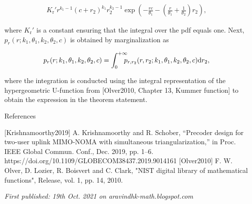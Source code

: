 \begin{align}K_\mathrm{r}' r^{k_1-1} (c+r_2)^{k_1} r_2^{k_2-1}\exp\left(-\frac{rc}{\theta_1}-\left(\frac{r}{\theta_1} +\frac{1}{\theta_2}\right)r_2\right),\end{align}

where $K_\mathrm{r}'$ is a constant ensuring that the integral over the pdf equals one. Next, 
$p_r(r;k_1,\theta_1,k_2,\theta_2,c)$ is obtained by marginalization as

\begin{equation}p_r(r;k_1,\theta_1,k_2,\theta_2,c) = \int_{0}^{+\infty} \hspace{-0.25cm} p_{r,r_2}(r,r_2;k_1,\theta_1,k_2,\theta_2,c) \mathrm{d} r_2,\end{equation}

where the integration is conducted using the integral representation of the hypergeometric U-function from [Olver2010, Chapter 13, Kummer function] to obtain the expression in the theorem statement.

References

[Krishnamoorthy2019] A. Krishnamoorthy and R. Schober, “Precoder design for two-user uplink MIMO-NOMA with simultaneous triangularization,” in Proc. IEEE Global Commun. Conf., Dec. 2019, pp. 1–6. https://doi.org/10.1109/GLOBECOM38437.2019.9014161
[Olver2010] F. W. Olver, D. Lozier, R. Boisvert and C. Clark, "NIST digital library of mathematical functions", Release, vol. 1, pp. 14, 2010.

\emph{First published: 19th Oct. 2021 on aravindhk-math.blogspot.com}
